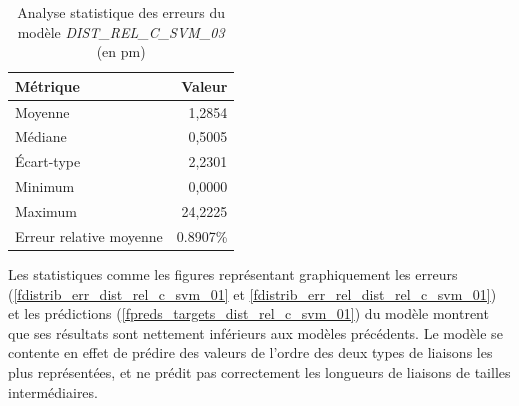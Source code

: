 \begin{table}
	\centering
	\begin{tabular}{|l|r|}
		\hline
		\textbf{Métrique} & \textbf{Valeur} \\ \hline
		Moyenne & 1,2854 \\ \hline
		Médiane & 0,5005 \\ \hline
		Écart-type & 2,2301 \\ \hline
		Minimum & 0,0000 \\ \hline
		Maximum & 24,2225\\ \hline
		Erreur relative moyenne & 0.8907\% \\ \hline
	\end{tabular}
	
	\caption{Analyse statistique des erreurs du modèle \emph{DIST\_REL\_C\_SVM\_03} (en pm)}
	\label{tstats_dist_rel_c_svm_01}
\end{table}

\par Les statistiques comme les figures représentant graphiquement les erreurs (\ref{fdistrib_err_dist_rel_c_svm_01} et \ref{fdistrib_err_rel_dist_rel_c_svm_01}) et les prédictions (\ref{fpreds_targets_dist_rel_c_svm_01}) du modèle montrent que ses résultats sont nettement inférieurs aux modèles précédents. Le modèle se contente en effet de prédire des valeurs de l'ordre des deux types de liaisons les plus représentées, et ne prédit pas correctement les longueurs de liaisons de tailles intermédiaires.\\


